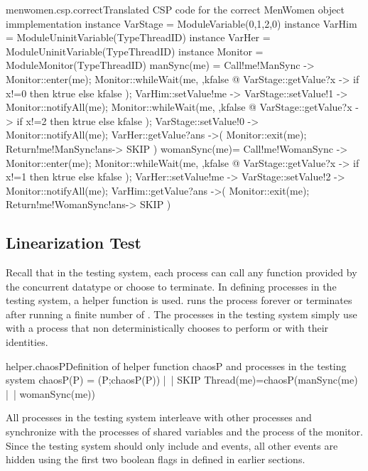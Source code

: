 \documentclass[a4paper, 12pt]{article}
\begin{document}
\begin{cspfloat}{menwomen.csp.correct}{Translated CSP code for the correct MenWomen object immplementation}
instance VarStage = ModuleVariable({0,1,2},0) 
instance VarHim = ModuleUninitVariable(TypeThreadID)
instance VarHer = ModuleUninitVariable(TypeThreadID)
instance Monitor = ModuleMonitor(TypeThreadID)
manSync(me) = 
  Call!me!ManSync ->
  Monitor::enter(me);
    Monitor::whileWait(me, \ktrue,kfalse @
      VarStage::getValue?x ->
      if x!=0 then ktrue else kfalse
    );
    VarHim::setValue!me ->
    VarStage::setValue!1 ->
    Monitor::notifyAll(me);
    Monitor::whileWait(me, \ktrue,kfalse @
      VarStage::getValue?x ->
      if x!=2 then ktrue else kfalse
    );
    VarStage::setValue!0 ->
    Monitor::notifyAll(me);
    VarHer::getValue?ans ->(
  Monitor::exit(me);
  Return!me!ManSync!ans->
  SKIP
  )
womanSync(me)=
  Call!me!WomanSync ->
  Monitor::enter(me);
    Monitor::whileWait(me, \ktrue,kfalse @
      VarStage::getValue?x ->
      if x!=1 then ktrue else kfalse
    );
    VarHer::setValue!me ->
    VarStage::setValue!2 ->
    Monitor::notifyAll(me);
    VarHim::getValue?ans ->(
  Monitor::exit(me);
  Return!me!WomanSync!ans->
  SKIP
  )
\end{cspfloat}


\subsection{Linearization Test}
Recall that in the testing system, each process can call any function provided by the concurrent datatype or choose to terminate. In defining processes in the testing system, a helper function is used.  runs the process  forever or terminates after running a finite number of . The processes in the testing system simply use  with a process that non deterministically chooses to perform  or  with their identities. 

\begin{cspinline}{helper.chaosP}{Definition of helper function chaosP and processes in the testing system}
chaosP(P) = (P;chaosP(P)) |~| SKIP
Thread(me)=chaosP(manSync(me) |~| womanSync(me))
\end{cspinline}
  
All processes in the testing system interleave with other processes and synchronize with the processes of shared variables and the process of the monitor. Since the testing system should only include  and  events, all other events are hidden using the first two boolean flags in  defined in earlier sections. 
\end{document}
